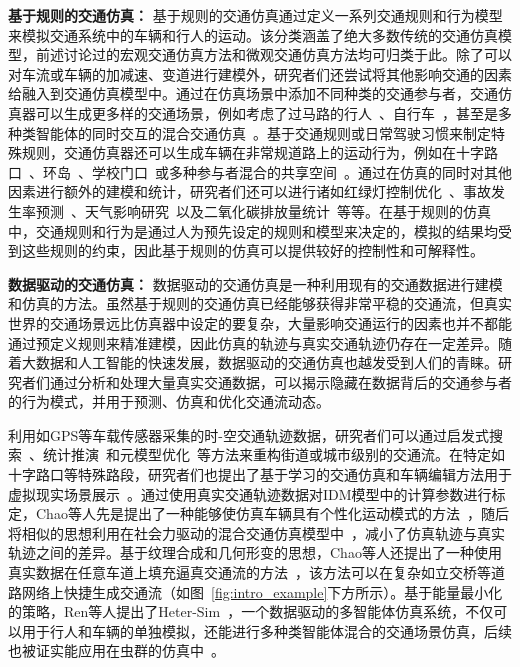 \textbf{基于规则的交通仿真：} 基于规则的交通仿真通过定义一系列交通规则和行为模型来模拟交通系统中的车辆和行人的运动。该分类涵盖了绝大多数传统的交通仿真模型，前述讨论过的宏观交通仿真方法和微观交通仿真方法均可归类于此。除了可以对车流或车辆的加减速、变道进行建模外，研究者们还尝试将其他影响交通的因素给融入到交通仿真模型中。通过在仿真场景中添加不同种类的交通参与者，交通仿真器可以生成更多样的交通场景，例如考虑了过马路的行人~\cite{chao2015vehicle, ning2017destination, ningbo2017simulation, chen2019modelling, wang2018shadow}、自行车~\cite{qu2017modeling}，甚至是多种类智能体的同时交互的混合交通仿真~\cite{anvari2015modelling, chao2019force, cai2020summit}。基于交通规则或日常驾驶习惯来制定特殊规则，交通仿真器还可以生成车辆在非常规道路上的运动行为，例如在十字路口~\cite{cunto2007microlevel, 2015An}、环岛~\cite{campari2004cellular}、学校门口~\cite{pang2015school}或多种参与者混合的共享空间~\cite{anvari2015modelling}。通过在仿真的同时对其他因素进行额外的建模和统计，研究者们还可以进行诸如红绿灯控制优化~\cite{shen2011agent, mckenney2013distributed, zhao2018signal}、事故发生率预测~\cite{cunto2007microlevel}、天气影响研究~\cite{chen2019assessing}以及二氧化碳排放量统计~\cite{quaassdorff2016microscale}等等。在基于规则的仿真中，交通规则和行为是通过人为预先设定的规则和模型来决定的，模拟的结果均受到这些规则的约束，因此基于规则的仿真可以提供较好的控制性和可解释性。

\textbf{数据驱动的交通仿真：} 数据驱动的交通仿真是一种利用现有的交通数据进行建模和仿真的方法。虽然基于规则的交通仿真已经能够获得非常平稳的交通流，但真实世界的交通场景远比仿真器中设定的要复杂，大量影响交通运行的因素也并不都能通过预定义规则来精准建模，因此仿真的轨迹与真实交通轨迹仍存在一定差异。随着大数据和人工智能的快速发展，数据驱动的交通仿真也越发受到人们的青睐。研究者们通过分析和处理大量真实交通数据，可以揭示隐藏在数据背后的交通参与者的行为模式，并用于预测、仿真和优化交通流动态。

利用如GPS等车载传感器采集的时-空交通轨迹数据，研究者们可以通过启发式搜索~\cite{sewall2010virtualized}、统计推演~\cite{wilkie2013flow}和元模型优化~\cite{li2017city}等方法来重构街道或城市级别的交通流。在特定如十字路口等特殊路段，研究者们也提出了基于学习的交通仿真和车辆编辑方法用于虚拟现实场景展示~\cite{bi2019deep}。通过使用真实交通轨迹数据对IDM模型中的计算参数进行标定，Chao等人先是提出了一种能够使仿真车辆具有个性化运动模式的方法~\cite{chao2013video}，随后将相似的思想利用在社会力驱动的混合交通仿真模型中~\cite{chao2021calibrated}，减小了仿真轨迹与真实轨迹之间的差异。基于纹理合成和几何形变的思想，Chao等人还提出了一种使用真实数据在任意车道上填充逼真交通流的方法~\cite{chao2017realistic}，该方法可以在复杂如立交桥等道路网络上快捷生成交通流（如图~\ref{fig:intro_example}下方所示）。基于能量最小化的策略，Ren等人提出了Heter-Sim~\cite{ren2019heter}，一个数据驱动的多智能体仿真系统，不仅可以用于行人和车辆的单独模拟，还能进行多种类智能体混合的交通场景仿真，后续也被证实能应用在虫群的仿真中~\cite{xiang2020fastswarm}。

